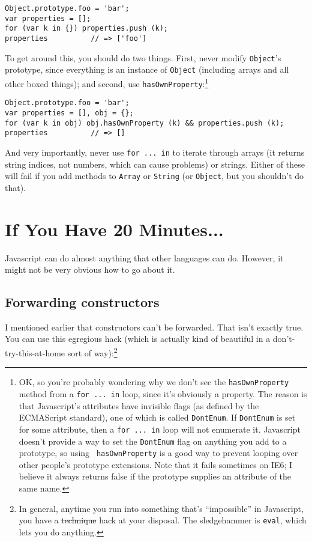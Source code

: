 \documentclass{article}
\begin{document}
\begin{verbatim}
Object.prototype.foo = 'bar';
var properties = [];
for (var k in {}) properties.push (k);
properties          // => ['foo']
\end{verbatim}

  To get around this, you should do two things. First, never modify \verb|Object|'s prototype, since everything is an instance of \verb|Object| (including arrays and all other boxed things);
  and second, use \verb|hasOwnProperty|:\footnote{OK, so you're probably wondering why we don't see the {\tt hasOwnProperty} method from a {\tt for ... in} loop, since it's obviously a
  property. The reason is that Javascript's attributes have invisible flags (as defined by the ECMAScript standard), one of which is called {\tt DontEnum}. If {\tt DontEnum} is set for some
  attribute, then a {\tt for ... in} loop will not enumerate it. Javascript doesn't provide a way to set the {\tt DontEnum} flag on anything you add to a prototype, so using {\tt
  hasOwnProperty} is a good way to prevent looping over other people's prototype extensions. Note that it fails sometimes on IE6; I believe it always returns false if the prototype supplies an
  attribute of the same name.}

\begin{verbatim}
Object.prototype.foo = 'bar';
var properties = [], obj = {};
for (var k in obj) obj.hasOwnProperty (k) && properties.push (k);
properties          // => []
\end{verbatim}

  And very importantly, never use \verb|for ... in| to iterate through arrays (it returns string indices, not numbers, which can cause problems) or strings. Either of these will fail if you
  add methods to {\tt Array} or {\tt String} (or {\tt Object}, but you shouldn't do that).

\section {If You Have 20 Minutes...}
  Javascript can do almost anything that other languages can do. However, it might not be very obvious how to go about it.

\subsection {Forwarding constructors}
    \label{sec:forwarding-constructors}
    I mentioned earlier that constructors can't be forwarded. That isn't exactly true. You can use this egregious hack (which is actually kind of beautiful in a don't-try-this-at-home sort of
    way):\footnote{In general, anytime you run into something that's ``impossible'' in Javascript, you have a \sout{technique} hack at your disposal. The sledgehammer is {\tt eval}, which lets
    you do anything.}
\end{document}
